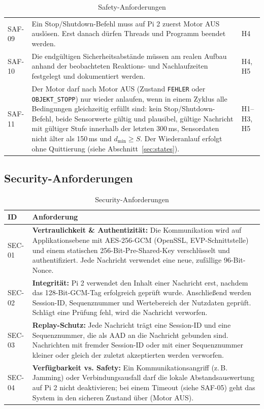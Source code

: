 \begin{table}[H]
\begin{tabularx}{\textwidth}{@{}p{1.5cm}Yp{2.0cm}@{}}
        SAF-09 & Ein Stop/Shutdown-Befehl muss auf Pi 2 zuerst Motor AUS auslösen. Erst danach dürfen Threads und Programm beendet werden. & H4 \\
        SAF-10 & Die endgültigen Sicherheitsabstände müssen am realen Aufbau anhand der beobachteten Reaktions- und Nachlaufzeiten festgelegt und dokumentiert werden. & H4, H5 \\
        SAF-11 & Der Motor darf nach Motor AUS (Zustand \texttt{FEHLER} oder \texttt{OBJEKT\_STOPP}) nur wieder anlaufen, wenn in einem Zyklus alle Bedingungen gleichzeitig erfüllt sind: kein Stop/Shutdown-Befehl, beide Sensorwerte gültig und plausibel, gültige Nachricht mit gültiger Stufe innerhalb der letzten 300\,ms, Sensordaten nicht älter als 150\,ms und $d_{\min} \geq S$. Der Wiederanlauf erfolgt ohne Quittierung (siehe Abschnitt~\ref{sec:states}). & H1--H3, H5 \\
        \bottomrule
    \end{tabularx}
    \caption{Safety-Anforderungen}
\end{table}

\subsection{Security-Anforderungen}

\begin{table}[H]
    \centering
    \small
    \begin{tabularx}{\textwidth}{@{}p{1.5cm}Y@{}}
        \toprule
        \textbf{ID} & \textbf{Anforderung} \\
        \midrule
        SEC-01 & \textbf{Vertraulichkeit \& Authentizität:} Die Kommunikation wird auf Applikationsebene mit AES-256-GCM (OpenSSL, EVP-Schnittstelle) und einem statischen 256-Bit-Pre-Shared-Key verschlüsselt und authentifiziert. Jede Nachricht verwendet eine neue, zufällige 96-Bit-Nonce. \\
        SEC-02 & \textbf{Integrität:} Pi 2 verwendet den Inhalt einer Nachricht erst, nachdem das 128-Bit-GCM-Tag erfolgreich geprüft wurde. Anschließend werden Session-ID, Sequenznummer und Wertebereich der Nutzdaten geprüft. Schlägt eine Prüfung fehl, wird die Nachricht verworfen. \\
        SEC-03 & \textbf{Replay-Schutz:} Jede Nachricht trägt eine Session-ID und eine Sequenznummer, die als AAD an die Nachricht gebunden sind. Nachrichten mit fremder Session-ID oder mit einer Sequenznummer kleiner oder gleich der zuletzt akzeptierten werden verworfen. \\
        SEC-04 & \textbf{Verfügbarkeit vs. Safety:} Ein Kommunikationsangriff (z.\,B. Jamming) oder Verbindungsausfall darf die lokale Abstandsauswertung auf Pi 2 nicht deaktivieren; bei einem Timeout (siehe SAF-05) geht das System in den sicheren Zustand über (Motor AUS). \\
        \bottomrule
    \end{tabularx}
    \caption{Security-Anforderungen}
\end{table}

